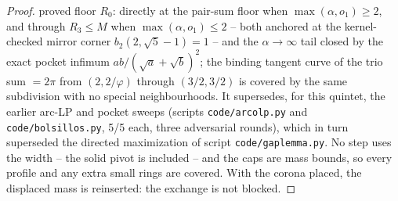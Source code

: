 \documentclass[11pt]{article}
\theoremstyle{definition}
\begin{document}
\begin{proof}
proved floor $R_0$: directly at the pair-sum floor when
$\max(\alpha,o_1)\ge2$, and through $R_3\le M$ when
$\max(\alpha,o_1)\le2$ -- both anchored at the kernel-checked
mirror corner $b_2(2,\sqrt5-1)=1$ -- and
the $\alpha\to\infty$ tail closed by
the exact pocket infimum $ab/(\sqrt a+\sqrt b)^{2}$; the binding
tangent curve of the trio sum $=2\pi$ from $(2,2/\varphi)$
through $(3/2,3/2)$ is covered by the same subdivision with no
special neighbourhoods. It supersedes, for this quintet, the
earlier arc-LP and pocket sweeps (scripts \texttt{code/arcolp.py}
and \texttt{code/bolsillos.py}, 5/5 each, three adversarial
rounds), which in turn superseded the directed maximization of
script \texttt{code/gaplemma.py}. No step uses the width -- the solid
pivot is included -- and the caps are mass bounds, so every
profile and any extra small rings are covered. With the corona
placed, the displaced mass is reinserted: the exchange is not
blocked.
\end{proof}
\end{document}
